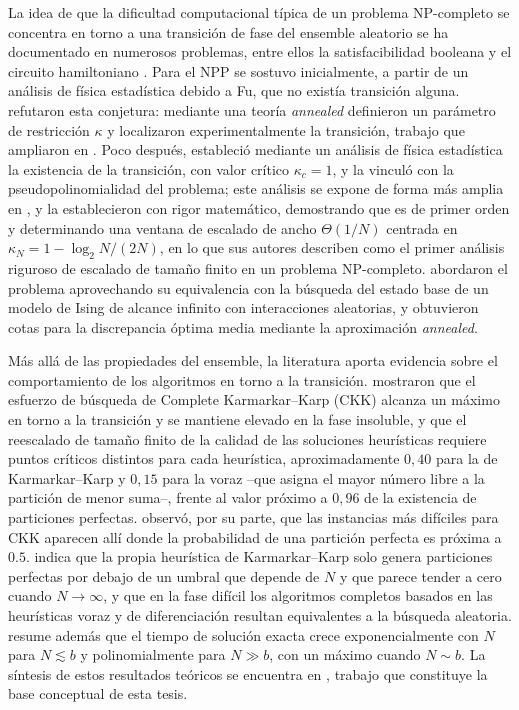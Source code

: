 La idea de que la dificultad computacional típica de un problema NP-completo se concentra en torno a una transición de fase del ensemble aleatorio se ha documentado en numerosos problemas, entre ellos la satisfacibilidad booleana y el circuito hamiltoniano \parencite{gent1998,mertens2006}. Para el NPP se sostuvo inicialmente, a partir de un análisis de física estadística debido a Fu, que no existía transición alguna. \textcite{gent1996} refutaron esta conjetura: mediante una teoría \emph{annealed} definieron un parámetro de restricción $\kappa$ y localizaron experimentalmente la transición, trabajo que ampliaron en \textcite{gent1998}. Poco después, \textcite{mertens1998} estableció mediante un análisis de física estadística la existencia de la transición, con valor crítico $\kappa_c = 1$, y la vinculó con la pseudopolinomialidad del problema; este análisis se expone de forma más amplia en \textcite{mertens2001}, y \textcite{borgs2001} la establecieron con rigor matemático, demostrando que es de primer orden y determinando una ventana de escalado de ancho $\Theta(1/N)$ centrada en $\kappa_N = 1 - \log_2 N/(2N)$, en lo que sus autores describen como el primer análisis riguroso de escalado de tamaño finito en un problema NP-completo. \textcite{ferreira1998} abordaron el problema aprovechando su equivalencia con la búsqueda del estado base de un modelo de Ising de alcance infinito con interacciones aleatorias, y obtuvieron cotas para la discrepancia óptima media mediante la aproximación \emph{annealed}.

Más allá de las propiedades del ensemble, la literatura aporta evidencia sobre el comportamiento de los algoritmos en torno a la transición. \textcite{gent1998} mostraron que el esfuerzo de búsqueda de Complete Karmarkar--Karp (CKK) alcanza un máximo en torno a la transición y se mantiene elevado en la fase insoluble, y que el reescalado de tamaño finito de la calidad de las soluciones heurísticas requiere puntos críticos distintos para cada heurística, aproximadamente $0{,}40$ para la de Karmarkar--Karp y $0{,}15$ para la voraz --que asigna el mayor número libre a la partición de menor suma--, frente al valor próximo a $0{,}96$ de la existencia de particiones perfectas. \textcite{korf1998} observó, por su parte, que las instancias más difíciles para CKK aparecen allí donde la probabilidad de una partición perfecta es próxima a $0.5$. \textcite{mertens2006} indica que la propia heurística de Karmarkar--Karp solo genera particiones perfectas por debajo de un umbral que depende de $N$ y que parece tender a cero cuando $N \to \infty$, y que en la fase difícil los algoritmos completos basados en las heurísticas voraz y de diferenciación resultan equivalentes a la búsqueda aleatoria. \textcite{mertens2001} resume además que el tiempo de solución exacta crece exponencialmente con $N$ para $N \lesssim b$ y polinomialmente para $N \gg b$, con un máximo cuando $N \sim b$. La síntesis de estos resultados teóricos se encuentra en \textcite{mertens2001}, trabajo que constituye la base conceptual de esta tesis.

